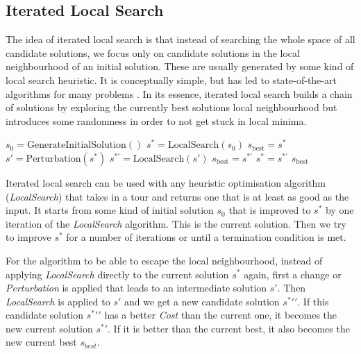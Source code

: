 \subsection{Iterated Local Search}
The idea of iterated local search is that instead of searching the whole space of all candidate solutions,
we focus only on candidate solutions in the local neighbourhood of an initial solution.
These are usually generated by some kind of local search heuristic.
It is conceptually simple, but has led to state-of-the-art algorithms for many problems \cite{lourencoIteratedLocalSearch2019}.
In its essence, iterated local search builds a chain of solutions by exploring the currently best solutions local neighbourhood
but introduces some randomness in order to not get stuck in local minima.

\begin{algorithm}[H]
	\caption{Iterated Local Search}
	\label{alg:ils}
	\begin{algorithmic}[1]
		\STATE $s_0 = \text{GenerateInitialSolution}()$
		\STATE $s^* = \text{LocalSearch}(s_0)$
		\STATE $s_{\text{best}} = s^*$
		\REPEAT
		\STATE $s' = \text{Perturbation}(s^*)$
		\STATE $s^{*\prime} = \text{LocalSearch}(s')$
		\STATE $s_{\text{best}} = s^{*\prime}$
		\ENDIF
		\STATE $s^* = s^{*\prime}$
		\ENDIF
		\RETURN $s_{\text{best}}$
	\end{algorithmic}
\end{algorithm}
Iterated local search can be used with any heuristic optimisation algorithm (\textit{LocalSearch}) that takes in a tour and returns one that is at least as good as the input.
It starts from some kind of initial solution \( s_{0} \) that is improved to \( s^* \) by one iteration of the \textit{LocalSearch} algorithm. This is the current solution.
Then we try to improve \( s^* \) for a number of iterations or until a termination condition is met.

For the algorithm to be able to escape the local neighbourhood, instead of applying \textit{LocalSearch} directly to the current solution \( s^* \) again,
first a change or \textit{Perturbation} is applied that leads to an intermediate solution \( s' \).
Then \textit{LocalSearch} is applied to \( s' \) and we get a new candidate solution \( s^*\prime ' \).
If this candidate solution \( s^*\prime ' \) has a better \textit{Cost} than the current one, it becomes the new current solution \( s^*\prime \).
If it is better than the current best, it also becomes the new current best \( s_{best} \).


